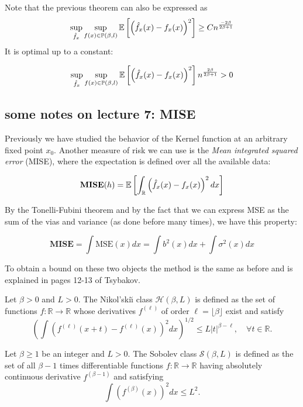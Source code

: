 \documentclass{article}
\begin{document}
\begin{remark}
    Note that the previous theorem can also be expressed as \[ 
    \sup_{\hat{f}_x} \sup_{f(x) \in \mathbb{P}(\beta , l)} \mathbb{E} \left[ \left(\hat{f}_{x}(x)-f_{x}(x)\right)^{2}\right] \geq C n^{\frac{-2\beta}{2\beta+1}}
    \]
    It is optimal up to a constant: 


    \[
    \sup_{\hat{f}_x} \sup_{f(x) \in \mathbb{P}(\beta , l)} \mathbb{E} \left[ \left(\hat{f}_{x}(x)-f_{x}(x)\right)^{2}\right] n^{\frac{2\beta}{2\beta+1}} > 0 
    \]
\end{remark}

\subsection{some notes on lecture 7: MISE}


Previously we have studied the behavior of the Kernel function at an arbitrary fixed point \(x_0\). Another measure of risk we can use is the \textit{Mean integrated squared error} (MISE), where the expectation is defined over all the available data:

\[
\textbf{MISE}(h)=\mathbb{E} \left[\int_{\mathbb{R}}\left(\hat{f}_{x}(x) - f_{x}(x)\right)^{2}dx\right]
\]

By the Tonelli-Fubini theorem and by the fact that we can express MSE as the sum of the vias and variance (as done before many times), we have this property:

\[
\textbf{MISE}=\int\text{MSE}(x)dx= \int b^{2}(x)dx + \int \sigma^{2}(x)dx
\]

To obtain a bound on these two objects the method is the same as before and is explained in pages 12-13 of Tsybakov. 


\begin{definition}
    Let $\beta > 0$ and $L > 0$. The Nikol'ski\u{\i} class $\mathcal{H}(\beta, L)$ is defined as the set of functions $f : \mathbb{R} \to \mathbb{R}$ whose derivatives $f^{(\ell)}$ of order $\ell = \lfloor \beta \rfloor$ exist and satisfy
    \[
    \left( \int \left( f^{(\ell)}(x + t) - f^{(\ell)}(x) \right)^2 dx \right)^{1/2} \leq L |t|^{\beta - \ell}, \quad \forall t \in \mathbb{R}.
    \]
    \end{definition}
    
    \begin{definition}
    Let $\beta \geq 1$ be an integer and $L > 0$. The Sobolev class $\mathcal{S}(\beta, L)$ is defined as the set of all $\beta - 1$ times differentiable functions $f : \mathbb{R} \to \mathbb{R}$ having absolutely continuous derivative $f^{(\beta-1)}$ and satisfying
    \[
    \int \left( f^{(\beta)}(x) \right)^2 dx \leq L^2.
    \]
    \end{definition}
    
\end{document}
